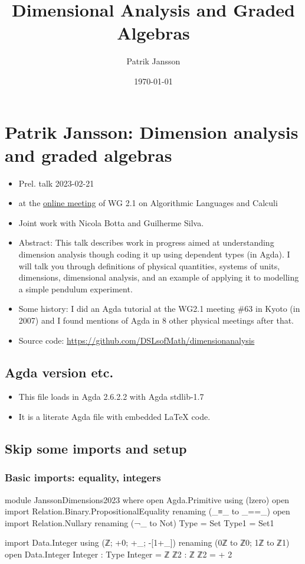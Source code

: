 \documentclass{article}
\author{Patrik Jansson}
\date{\today}
\title{Dimensional Analysis and Graded Algebras}
\begin{document}
\section{Patrik Jansson: Dimension analysis and graded algebras}
\label{sec:org7abdf0f}
\begin{itemize}
\item Prel. talk 2023-02-21
\item at the \href{https://ifipwg21wiki.cs.kuleuven.be/IFIP21/OnlineFeb23}{online meeting} of WG 2.1 on Algorithmic Languages and Calculi
\item Joint work with Nicola Botta and Guilherme Silva.
\item Abstract:
This talk describes work in progress aimed at understanding dimension analysis
though coding it up using dependent types (in Agda). I will talk you through
definitions of physical quantities, systems of units, dimensions, dimensional
analysis, and an example of applying it to modelling a simple pendulum
experiment.
\item Some history: I did an Agda tutorial at the WG2.1 meeting \#63 in Kyoto
(in 2007) and I found mentions of Agda in 8 other physical meetings after
that.
\item Source code: \url{https://github.com/DSLsofMath/dimensionanalysis}
\end{itemize}
\subsection{Agda version etc.}
\label{sec:org0a55a2b}
\begin{itemize}
\item This file loads in Agda 2.6.2.2 with Agda stdlib-1.7
\item It is a literate Agda file with embedded LaTeX code.
\end{itemize}
\subsection{Skip some imports and setup}
\label{sec:orga01e249}
\subsubsection{Basic imports: equality, integers}
\label{sec:org28c6c1b}
\begin{code}
module JanssonDimensions2023 where
open Agda.Primitive using (lzero)
open import Relation.Binary.PropositionalEquality renaming (_≡_ to _==_)
open import Relation.Nullary renaming (¬_ to Not)
Type = Set
Type1 = Set1

import Data.Integer using (ℤ; +0; +_; -[1+_])
                    renaming (0ℤ to ℤ0; 1ℤ to ℤ1)
open Data.Integer
Integer : Type
Integer = ℤ
ℤ2 : ℤ
ℤ2 = + 2
\end{code}
\end{document}
